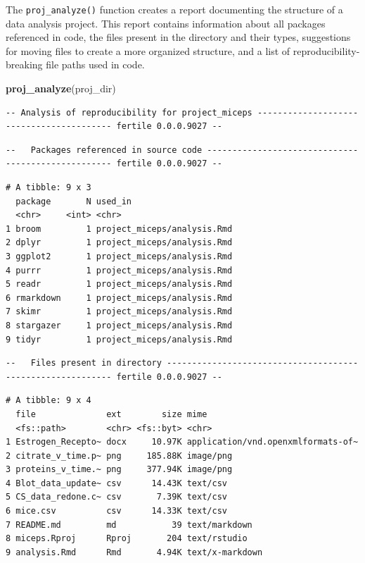 \documentclass[12pt,twoside]{reedthesis}
\newenvironment{Shaded}{\begin{snugshade}}{\end{snugshade}}
\newcommand{\KeywordTok}[1]{\textcolor[rgb]{0.13,0.29,0.53}{\textbf{#1}}}
\newcommand{\NormalTok}[1]{#1}
\begin{document}
The \texttt{proj\_analyze()} function creates a report documenting the
structure of a data analysis project. This report contains information
about all packages referenced in code, the files present in the
directory and their types, suggestions for moving files to create a more
organized structure, and a list of reproducibility-breaking file paths
used in code.
\begin{Shaded}
\begin{Highlighting}[]
\KeywordTok{proj_analyze}\NormalTok{(proj_dir)}
\end{Highlighting}
\end{Shaded}
\begin{verbatim}
-- Analysis of reproducibility for project_miceps ----------------------------------------- fertile 0.0.0.9027 --
\end{verbatim}
\begin{verbatim}
--   Packages referenced in source code --------------------------------------------------- fertile 0.0.0.9027 --
\end{verbatim}
\begin{verbatim}
# A tibble: 9 x 3
  package       N used_in                    
  <chr>     <int> <chr>                      
1 broom         1 project_miceps/analysis.Rmd
2 dplyr         1 project_miceps/analysis.Rmd
3 ggplot2       1 project_miceps/analysis.Rmd
4 purrr         1 project_miceps/analysis.Rmd
5 readr         1 project_miceps/analysis.Rmd
6 rmarkdown     1 project_miceps/analysis.Rmd
7 skimr         1 project_miceps/analysis.Rmd
8 stargazer     1 project_miceps/analysis.Rmd
9 tidyr         1 project_miceps/analysis.Rmd
\end{verbatim}
\begin{verbatim}
--   Files present in directory ----------------------------------------------------------- fertile 0.0.0.9027 --
\end{verbatim}
\begin{verbatim}
# A tibble: 9 x 4
  file              ext        size mime                              
  <fs::path>        <chr> <fs::byt> <chr>                             
1 Estrogen_Recepto~ docx     10.97K application/vnd.openxmlformats-of~
2 citrate_v_time.p~ png     185.88K image/png                         
3 proteins_v_time.~ png     377.94K image/png                         
4 Blot_data_update~ csv      14.43K text/csv                          
5 CS_data_redone.c~ csv       7.39K text/csv                          
6 mice.csv          csv      14.33K text/csv                          
7 README.md         md           39 text/markdown                     
8 miceps.Rproj      Rproj       204 text/rstudio                      
9 analysis.Rmd      Rmd       4.94K text/x-markdown                   
\end{verbatim}
\end{document}

